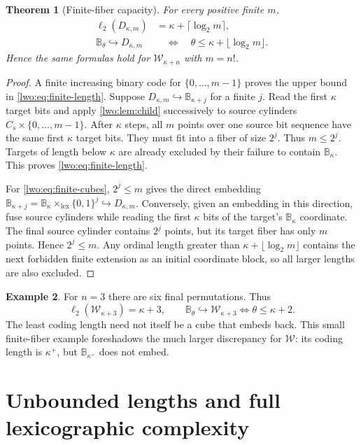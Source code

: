 \documentclass[11pt,a4paper]{article}
\newtheorem{theorem}{Theorem}[section]
\theoremstyle{definition}
\newtheorem{example}[theorem]{Example}
\theoremstyle{remark}
\newcommand{\W}{\mathcal W}
\newcommand{\B}{\mathbb B}
\newcommand{\two}{\{0,1\}}
\newcommand{\lex}{\mathrm{lex}}
\newcommand{\bl}{\ell_2}
\newcommand{\emb}{\hookrightarrow}
\begin{document}
\begin{theorem}[Finite-fiber capacity]\label{lwo:thm:finite-capacity}
For every positive finite $m$,
\begin{align}
 \bl(D_{\kappa,m})&=\kappa+\lceil\log_2m\rceil,\label{lwo:eq:finite-length}\\
 \B_\theta\emb D_{\kappa,m}
       &\quad\Longleftrightarrow\quad
             \theta\leq\kappa+\lfloor\log_2m\rfloor.
             \label{lwo:eq:finite-cubes}
\end{align}
Hence the same formulas hold for $\W_{\kappa+n}$ with $m=n!$.
\end{theorem}
\begin{proof}
A finite increasing binary code for $\{0,\ldots,m-1\}$ proves the upper
bound in \eqref{lwo:eq:finite-length}. Suppose
$D_{\kappa,m}\emb\B_{\kappa+j}$ for a finite $j$. Read the first $\kappa$
target bits and apply \cref{lwo:lem:child} successively to source cylinders
$C_s\times\{0,\ldots,m-1\}$. After $\kappa$ steps, all $m$ points over one
source bit sequence have the same first $\kappa$ target bits. They must fit
into a fiber of size $2^j$. Thus $m\leq2^j$. Targets of length below
$\kappa$ are already excluded by their failure to contain $\B_\kappa$.
This proves \eqref{lwo:eq:finite-length}.

For \eqref{lwo:eq:finite-cubes}, $2^j\leq m$ gives the direct embedding
$\B_{\kappa+j}=\B_\kappa\times_{\lex}\two^j\emb D_{\kappa,m}$.
Conversely, given an embedding in this direction, fuse source cylinders
while reading the first $\kappa$ bits of the target's $\B_\kappa$
coordinate. The final source cylinder contains $2^j$ points, but its target
fiber has only $m$ points. Hence $2^j\leq m$. Any ordinal length greater
than $\kappa+\lfloor\log_2m\rfloor$ contains the next forbidden finite
extension as an initial coordinate block, so all larger lengths are also
excluded.
\end{proof}

\begin{example}
For $n=3$ there are six final permutations. Thus
\[
 \bl(\W_{\kappa+3})=\kappa+3,
 \qquad
 \B_\theta\emb\W_{\kappa+3}
       \Longleftrightarrow\theta\leq\kappa+2.
\]
The least coding length need not itself be a cube that embeds back. This
small finite-fiber example foreshadows the much larger discrepancy for
$\W$: its coding length is $\kappa^+$, but $\B_{\kappa^+}$ does not embed.
\end{example}

\section{Unbounded lengths and full lexicographic complexity}\label{lwo:sec:length}
\end{document}
